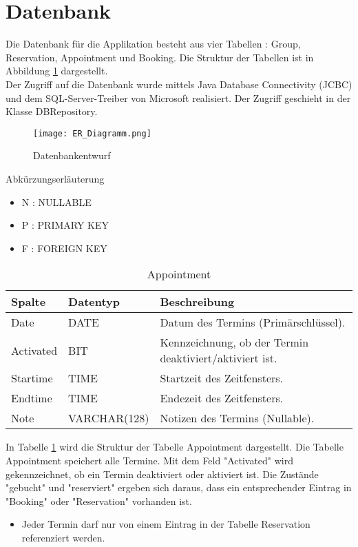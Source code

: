 \graphicspath{ {Entwurf/exports/png/} }

\section{Datenbank}
Die Datenbank für die Applikation besteht aus vier Tabellen : Group, Reservation, Appointment und Booking.
Die Struktur der Tabellen ist in Abbildung \ref{fig:ER-Diagramm} dargestellt. \\

Der Zugriff auf die Datenbank wurde mittels Java Database Connectivity (JCBC) und dem SQL-Server-Treiber von Microsoft realisiert. Der Zugriff geschieht in der Klasse DBRepository.

\begin{figure}[ht]
	\centering
	\texttt{[image: ER\_Diagramm.png]}
	\caption{Datenbankentwurf}
	\label{fig:ER-Diagramm}
\end{figure}

Abkürzungserläuterung
\begin{itemize}
\item N : NULLABLE
\item P : PRIMARY KEY
\item F : FOREIGN KEY
\end{itemize}

\begin{table}[h]
	\centering
	\caption{Appointment}
	\label{tab:Appointment}
    \begin{tabular}{| p{2cm} | p{3cm} | p{10cm} |}
    \hline
    \rowcolor{lightgray} Spalte & Datentyp & Beschreibung  \\ \hline
    Date  & DATE & Datum des Termins (Primärschlüssel).\\ \hline
    Activated & BIT & Kennzeichnung, ob der Termin deaktiviert/aktiviert ist.\\ \hline
    Startime & TIME & Startzeit des Zeitfensters. \\ \hline
    Endtime & TIME & Endezeit des Zeitfensters.  \\ \hline
    Note & VARCHAR(128) & Notizen des Termins (Nullable). \\ \hline
    \end{tabular}
\end{table}

In Tabelle \ref{tab:Appointment} wird die Struktur der Tabelle Appointment dargestellt. Die Tabelle Appointment speichert alle Termine. Mit dem Feld "Activated" wird gekennzeichnet, ob ein Termin deaktiviert oder aktiviert ist. Die Zustände "gebucht" und "reserviert" ergeben sich daraus, dass ein entsprechender Eintrag in "Booking" oder "Reservation" vorhanden ist.
\begin{itemize}
	\item Jeder Termin darf nur von einem Eintrag in der Tabelle Reservation referenziert werden.
\end{itemize}

